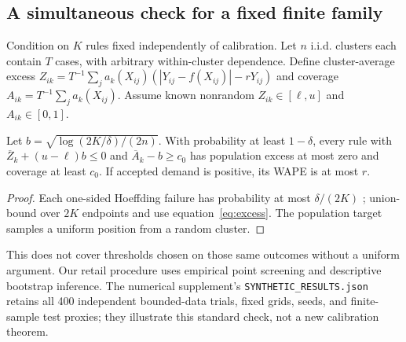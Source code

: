 \subsection{A simultaneous check for a fixed finite family}
\label{app:calibration}
Condition on $K$ rules fixed independently of calibration. Let $n$ i.i.d. clusters each contain $T$ cases, with arbitrary within-cluster dependence. Define cluster-average excess $Z_{ik}=T^{-1}\sum_j a_k(X_{ij})(|Y_{ij}-f(X_{ij})|-rY_{ij})$ and coverage $A_{ik}=T^{-1}\sum_j a_k(X_{ij})$. Assume known nonrandom $Z_{ik}\in[\ell,u]$ and $A_{ik}\in[0,1]$.
\begin{theorem}
Let $b=\sqrt{\log(2K/\delta)/(2n)}$. With probability at least $1-\delta$, every rule with $\overline Z_k+(u-\ell)b\leq0$ and $\overline A_k-b\geq c_0$ has population excess at most zero and coverage at least $c_0$. If accepted demand is positive, its WAPE is at most $r$.
\end{theorem}
\begin{proof}
Each one-sided Hoeffding failure has probability at most $\delta/(2K)$ \citep{hoeffding1963}; union-bound over $2K$ endpoints and use equation~\eqref{eq:excess}. The population target samples a uniform position from a random cluster.
\end{proof}
This does not cover thresholds chosen on those same outcomes without a uniform argument. Our retail procedure uses empirical point screening and descriptive bootstrap inference. The numerical supplement's \texttt{SYNTHETIC\_RESULTS.json} retains all 400 independent bounded-data trials, fixed grids, seeds, and finite-sample test proxies; they illustrate this standard check, not a new calibration theorem.

